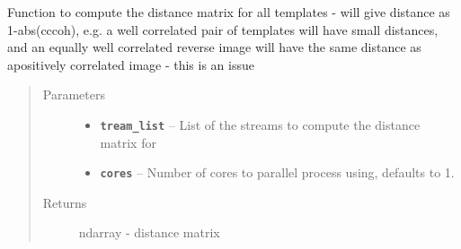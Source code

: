 \documentclass[a4paper,10pt,english]{sphinxmanual}
\begin{document}

\begin{fulllineitems}
\label{submodules/utils.clustering:clustering.distance_matrix}
Function to compute the distance matrix for all templates - will give
distance as 1-abs(cccoh), e.g. a well correlated pair of templates will
have small distances, and an equally well correlated reverse image will
have the same distance as apositively correlated image - this is an issue
\begin{quote}\begin{description}
\item[{Parameters}] \leavevmode\begin{itemize}
\item {} 
\textbf{\texttt{tream\_list}} -- List of the streams to compute the distance matrix for

\item {} 
\textbf{\texttt{cores}} -- Number of cores to parallel process using, defaults to 1.

\end{itemize}

\item[{Returns}] \leavevmode
ndarray - distance matrix

\end{description}\end{quote}

\end{fulllineitems}

\end{document}
